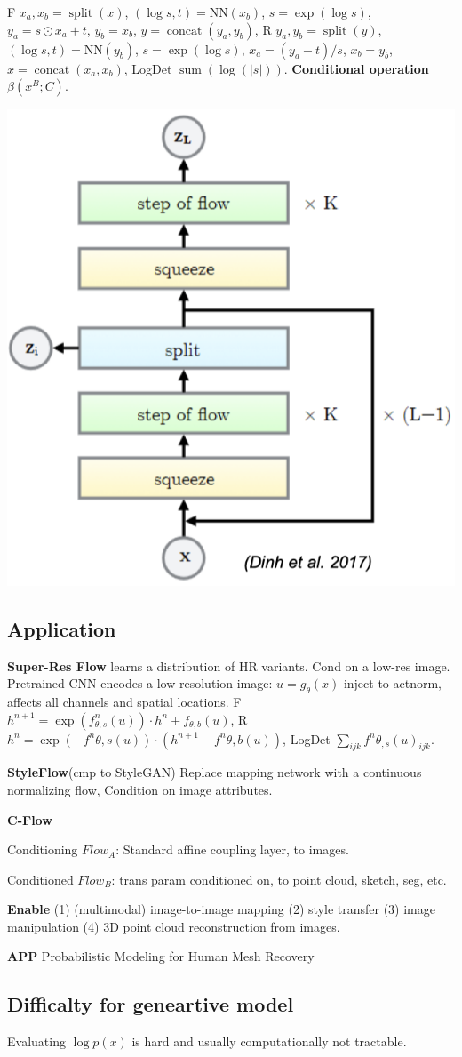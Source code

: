 \textsf{F} \({x}_{a}, {x}_{b}=\operatorname{split}({x})\), \((\log {s}, {t})=\mathrm{NN}({x}_{b}) \), \({s}=\exp (\log {s})\), \( {y}_{a}={s} \odot {x}_{a}+{t}\), \({y}_{b}={x}_{b}\), \({y}=\operatorname{concat}({y}_{a}, {y}_{b})\),
\textsf{R} \({y}_{a}, {y}_{b}=\operatorname{split}({y})\), \((\log {s}, {t})=\mathrm{NN}({y}_{b})\), \({s}=\exp (\log {s})\), \({x}_{a}=({y}_{a}-{t}) / {s}\), \({x}_{b}={y}_{b}\), \({x}=\operatorname{concat}({x}_{a}, {x}_{b})\),
\textsf{LogDet} \(\operatorname{sum}(\log (|{s}|))\).
\textbf{Conditional operation} \(\beta(x^{B};C)\).

\begin{center}
    \includegraphics[width=0.5\columnwidth]{figures/flow_block.png}
\end{center}

\subsection*{Application}

\textbf{Super-Res Flow} learns a distribution of HR variants. Cond on a low-res image.  Pretrained CNN encodes a low-resolution image: \({u}=g_{\theta}({x})\) inject to actnorm, affects all channels and spatial locations. \textsf{F} \({h}^{n+1}=\exp (f_{{\theta}, s}^{n}({u})) \cdot {h}^{n}+f_{{\theta}, b}({u})\), \textsf{R} \({h}^{n}=\exp (-f^{n} {\theta}, s({u})) \cdot({h}^{n+1}-f^{n} {\theta}, b({u}))\), \textsf{LogDet} \(\sum_{i j k} f^{n} {\theta}_{, s}({u})_{i j k}\).


\textbf{StyleFlow}(cmp to StyleGAN) Replace mapping network with a continuous normalizing flow, Condition on image attributes.


\textbf{C-Flow} 

Conditioning \(Flow_A\): Standard affine coupling layer, to images.

Conditioned \(Flow_B\): trans param conditioned on, to point cloud, sketch, seg, etc.

\textbf{Enable} (1) (multimodal) image-to-image mapping (2) style transfer (3) image manipulation (4) 3D point cloud reconstruction from images.

\textbf{APP} Probabilistic Modeling for Human Mesh Recovery

\subsection*{Difficalty for geneartive model}
Evaluating \(\log p(x)\) is hard and usually computationally not tractable.
